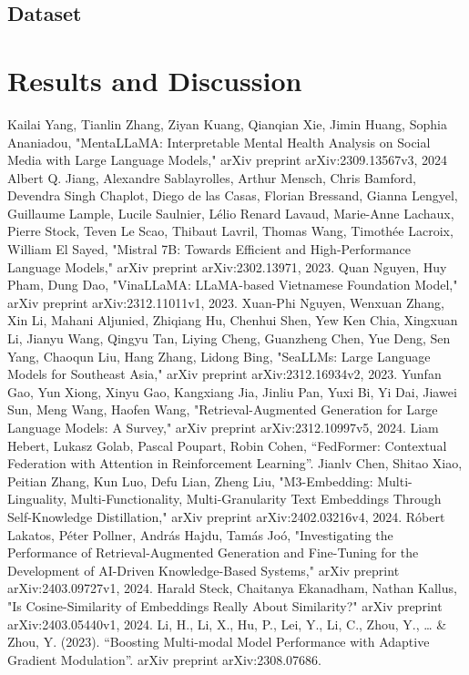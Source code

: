 \documentclass[conference]{IEEEtran}
\begin{document}
\subsection{Dataset}
  
\section{Results and Discussion}


\begin{thebibliography}{9}
     Kailai Yang, Tianlin Zhang, Ziyan Kuang, Qianqian Xie, Jimin Huang, Sophia Ananiadou, "MentaLLaMA: Interpretable Mental Health Analysis on Social Media with Large Language Models," arXiv preprint arXiv:2309.13567v3, 2024
     Albert Q. Jiang, Alexandre Sablayrolles, Arthur Mensch, Chris Bamford, Devendra Singh Chaplot, Diego de las Casas, Florian Bressand, Gianna Lengyel, Guillaume Lample, Lucile Saulnier, Lélio Renard Lavaud, Marie-Anne Lachaux, Pierre Stock, Teven Le Scao, Thibaut Lavril, Thomas Wang, Timothée Lacroix, William El Sayed, "Mistral 7B: Towards Efficient and High-Performance Language Models," arXiv preprint arXiv:2302.13971, 2023.
     Quan Nguyen, Huy Pham, Dung Dao, "VinaLLaMA: LLaMA-based Vietnamese Foundation Model," arXiv preprint arXiv:2312.11011v1, 2023.
     Xuan-Phi Nguyen, Wenxuan Zhang, Xin Li, Mahani Aljunied, Zhiqiang Hu, Chenhui Shen, Yew Ken Chia, Xingxuan Li, Jianyu Wang, Qingyu Tan, Liying Cheng, Guanzheng Chen, Yue Deng, Sen Yang, Chaoqun Liu, Hang Zhang, Lidong Bing, "SeaLLMs: Large Language Models for Southeast Asia," arXiv preprint arXiv:2312.16934v2, 2023.
     Yunfan Gao, Yun Xiong, Xinyu Gao, Kangxiang Jia, Jinliu Pan, Yuxi Bi, Yi Dai, Jiawei Sun, Meng Wang, Haofen Wang, "Retrieval-Augmented Generation for Large Language Models: A Survey," arXiv preprint arXiv:2312.10997v5, 2024.
     Liam Hebert, Lukasz Golab, Pascal Poupart, Robin Cohen, ``FedFormer: Contextual Federation with Attention in Reinforcement Learning''.
     Jianlv Chen, Shitao Xiao, Peitian Zhang, Kun Luo, Defu Lian, Zheng Liu, "M3-Embedding: Multi-Linguality, Multi-Functionality, Multi-Granularity Text Embeddings Through Self-Knowledge Distillation," arXiv preprint arXiv:2402.03216v4, 2024.
     Róbert Lakatos, Péter Pollner, András Hajdu, Tamás Joó, "Investigating the Performance of Retrieval-Augmented Generation and Fine-Tuning for the Development of AI-Driven Knowledge-Based Systems," arXiv preprint arXiv:2403.09727v1, 2024.
     Harald Steck, Chaitanya Ekanadham, Nathan Kallus, "Is Cosine-Similarity of Embeddings Really About Similarity?" arXiv preprint arXiv:2403.05440v1, 2024.
     Li, H., Li, X., Hu, P., Lei, Y., Li, C., Zhou, Y., … \& Zhou, Y. (2023). ``Boosting Multi-modal Model Performance with Adaptive Gradient Modulation''. arXiv preprint arXiv:2308.07686.
\end{thebibliography}
\end{document}
